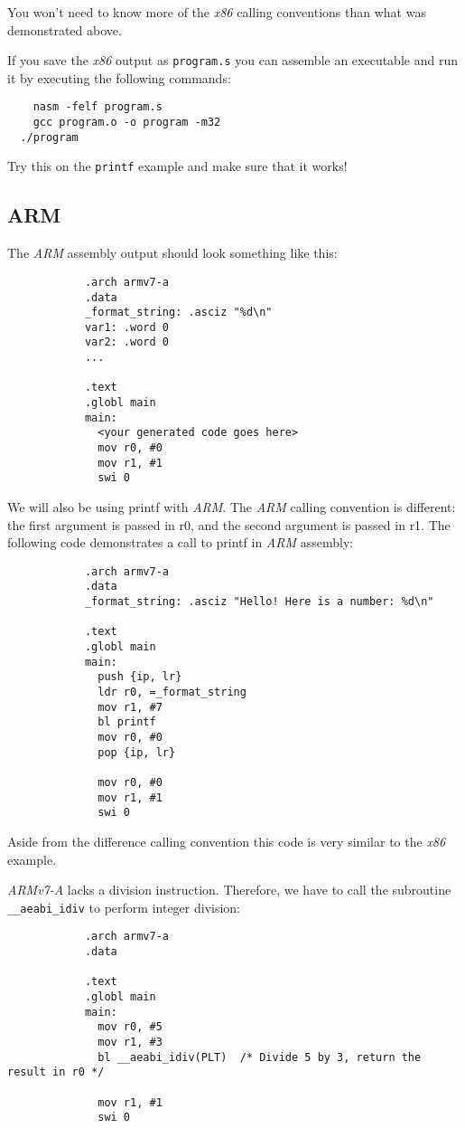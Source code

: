 \documentclass{article}
\newcommand{\code}[1]{\texttt{\textmd{#1}}}
\begin{document}
You won't need to know more of the \textit{x86} calling conventions than what was demonstrated
above.

If you save the \textit{x86} output as \code{program.s} you can assemble an executable and run it
by executing the following commands:
\begin{lstlisting}
	nasm -felf program.s
	gcc program.o -o program -m32
  ./program
\end{lstlisting}

Try this on the \code{printf} example and make sure that it works!

	\subsection{ARM}

		The \textit{ARM} assembly output should look something like this:

		\begin{lstlisting}
			.arch armv7-a
			.data
			_format_string: .asciz "%d\n"
			var1: .word 0
			var2: .word 0
			...

			.text
			.globl main
			main:
			  <your generated code goes here>
			  mov r0, #0
			  mov r1, #1
			  swi 0
		\end{lstlisting}

		We will also be using printf with \textit{ARM}. The \textit{ARM} calling convention is different: the first
		argument is passed in r0, and the second argument is passed in r1. The following code demonstrates a call to
		printf in \textit{ARM} assembly:

		\begin{lstlisting}
			.arch armv7-a
			.data
			_format_string: .asciz "Hello! Here is a number: %d\n"

			.text
			.globl main
			main:
			  push {ip, lr}
			  ldr r0, =_format_string
			  mov r1, #7
			  bl printf
			  mov r0, #0
			  pop {ip, lr}

			  mov r0, #0
			  mov r1, #1
			  swi 0
		\end{lstlisting}

		Aside from the difference calling convention this code is very similar to the \textit{x86} example.

		\textit{ARMv7-A} lacks a division instruction. Therefore, we have to call the subroutine
		\texttt{\_\_aeabi\_idiv} to perform integer division:

		\begin{lstlisting}
			.arch armv7-a
			.data

			.text
			.globl main
			main:
			  mov r0, #5
			  mov r1, #3
			  bl __aeabi_idiv(PLT)  /* Divide 5 by 3, return the result in r0 */

			  mov r1, #1
			  swi 0
		\end{lstlisting}
\end{document}
